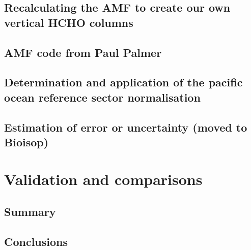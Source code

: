   \subsection{Recalculating the AMF to create our own vertical HCHO columns}
  \label{ch_HCHO:sec:recalculating_AMF_description}
    
    
    
    
  \subsection{AMF code from Paul Palmer}
  \label{ch_HCHO:sec:PPCode}
   
   
    
  \subsection{Determination and application of the pacific ocean reference sector normalisation}
    \label{ch_HCHO:sec:RSC}


    
  \subsection{Estimation of error or uncertainty (moved to Bioisop)}
    
  
\section{Validation and comparisons}
  \label{ch_HCHO:sec:Validation}
  
  

  \subsection{Summary}

    
    
    \subsection{Conclusions}

